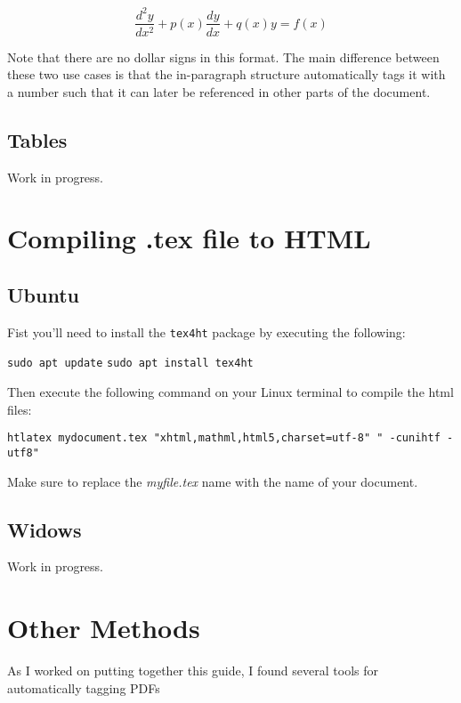 \documentclass[lang=en]{article}
\newcommand{\code}[1]{\colorbox{light-gray}{\texttt{#1}}}
\begin{document}
\begin{equation}
  \frac{d^2y}{dx^2} + p(x) \frac{dy}{dx} + q(x)y = f(x)
\end{equation}

Note that there are no dollar signs in this format. The main difference between
these two use cases is that the in-paragraph structure automatically tags it
with a number such that it can later be referenced in other parts of the
document.


\subsection{Tables}

Work in progress.


\section{Compiling .tex file to HTML}
\label{sec:Compiling .tex file to HTML}

\subsection{Ubuntu}

Fist you'll need to install the \code{tex4ht} package by executing the
following:

\code{sudo apt update}
\code{sudo apt install tex4ht}

Then execute the following command on your Linux terminal to compile the html
files:

\code{htlatex mydocument.tex "xhtml,mathml,html5,charset=utf-8" " -cunihtf -utf8"}

Make sure to replace the \textit{myfile.tex} name with the name of your
document.


\subsection{Widows}

Work in progress.


\section{Other Methods}

As I worked on putting together this guide, I found several tools for
automatically tagging PDFs







\end{document}
